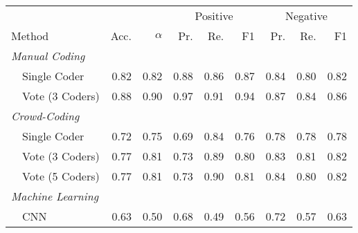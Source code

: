 \footnotesize
\begin{tabularx}{\textwidth}{lXXrrrrrrrr}
\toprule
& & & & & \multicolumn{3}{c}{Positive} & \multicolumn{3}{c}{Negative} \\
\cmidrule(r){6-8}\cmidrule(l){9-11} 
\multicolumn{3}{l}{Method} & Acc. & $\alpha$ & Pr. & Re. & F1& Pr. & Re. & F1 \\
\midrule

\multicolumn{11}{l}{\emph{ Manual Coding }} \\

 & \multicolumn{2}{l}{ Single Coder }& \cellcolor[gray]{0.59} 0.82& \cellcolor[gray]{0.59} 0.82& \cellcolor[gray]{0.56} 0.88& \cellcolor[gray]{0.57} 0.86& \cellcolor[gray]{0.57} 0.87& \cellcolor[gray]{0.58} 0.84& \cellcolor[gray]{0.60} 0.80& \cellcolor[gray]{0.59} 0.82\\

 & \multicolumn{2}{l}{ Vote (3 Coders) }& \cellcolor[gray]{0.56} 0.88& \cellcolor[gray]{0.55} 0.90& \cellcolor[gray]{0.52} 0.97& \cellcolor[gray]{0.54} 0.91& \cellcolor[gray]{0.53} 0.94& \cellcolor[gray]{0.56} 0.87& \cellcolor[gray]{0.58} 0.84& \cellcolor[gray]{0.57} 0.86\\


\multicolumn{11}{l}{\emph{ Crowd-Coding }} \\

 & \multicolumn{2}{l}{ Single Coder }& \cellcolor[gray]{0.64} 0.72& \cellcolor[gray]{0.62} 0.75& \cellcolor[gray]{0.65} 0.69& \cellcolor[gray]{0.58} 0.84& \cellcolor[gray]{0.62} 0.76& \cellcolor[gray]{0.61} 0.78& \cellcolor[gray]{0.61} 0.78& \cellcolor[gray]{0.61} 0.78\\

 & \multicolumn{2}{l}{ Vote (3 Coders) }& \cellcolor[gray]{0.62} 0.77& \cellcolor[gray]{0.60} 0.81& \cellcolor[gray]{0.63} 0.73& \cellcolor[gray]{0.55} 0.89& \cellcolor[gray]{0.60} 0.80& \cellcolor[gray]{0.58} 0.83& \cellcolor[gray]{0.59} 0.81& \cellcolor[gray]{0.59} 0.82\\

 & \multicolumn{2}{l}{ Vote (5 Coders) }& \cellcolor[gray]{0.62} 0.77& \cellcolor[gray]{0.59} 0.81& \cellcolor[gray]{0.63} 0.73& \cellcolor[gray]{0.55} 0.90& \cellcolor[gray]{0.60} 0.81& \cellcolor[gray]{0.58} 0.84& \cellcolor[gray]{0.60} 0.80& \cellcolor[gray]{0.59} 0.82\\


\multicolumn{11}{l}{\emph{ Machine Learning }} \\

 & \multicolumn{2}{l}{ CNN }& \cellcolor[gray]{0.68} 0.63& \cellcolor[gray]{0.75} 0.50& \cellcolor[gray]{0.66} 0.68& \cellcolor[gray]{0.76} 0.49& \cellcolor[gray]{0.72} 0.56& \cellcolor[gray]{0.64} 0.72& \cellcolor[gray]{0.71} 0.57& \cellcolor[gray]{0.68} 0.63\\


\end{tabularx}

